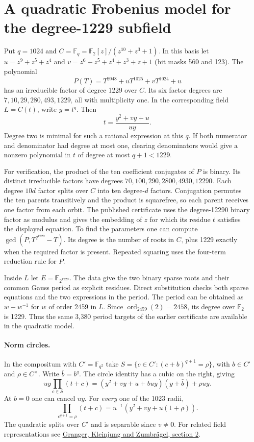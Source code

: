 \documentclass[11pt]{article}
\newcommand{\F}{\mathbb F_2}
\begin{document}
\section{A quadratic Frobenius model for the degree-1229 subfield}
\label{sec:quadratic-frobenius}
Put \(q=1024\) and \(C=\mathbb F_q=\F[z]/(z^{10}+z^3+1)\). In this
basis let \(u=z^9+z^5+z^4\) and \(v=z^6+z^5+z^4+z^3+z+1\)
(bit masks 560 and 123). The polynomial
\[
 P(T)=T^{2048}+uT^{1025}+vT^{1024}+u
\]
has an irreducible factor of degree 1229 over \(C\). Its six factor
degrees are \(7,10,29,280,493,1229\), all with multiplicity one.
In the corresponding field \(L=C(t)\), write \(y=t^q\). Then
\[
       t=\frac{y^2+vy+u}{uy}.
\]
Degree two is minimal for such a rational expression at this \(q\).
If both numerator and denominator had degree at most one, clearing
denominators would give a nonzero polynomial in \(t\) of degree at
most \(q+1<1229\).

For verification, the product of the ten coefficient conjugates
of \(P\) is binary. Its distinct irreducible factors have degrees
\(70,100,290,2800,4930,12290\). Each degree \(10d\) factor splits
over \(C\) into ten degree-\(d\) factors. Conjugation permutes the
ten parents transitively and the product is squarefree, so each
parent receives one factor from each orbit. The published certificate
uses the degree-12290 binary factor as modulus and gives the embedding
of \(z\) for which its residue \(t\) satisfies the displayed equation.
To find the parameters one can compute
\(\gcd(P,T^{q^{1229}}-T)\). Its degree is the number of roots in \(C\),
plus 1229 exactly when the required factor is present. Repeated
squaring uses the four-term reduction rule for \(P\).

Inside \(L\) let \(E=\mathbb F_{2^{1229}}\). The data give the two
binary sparse roots and their common Gauss period as explicit residues.
Direct substitution checks both sparse equations and the two
expressions in the period. The period can be obtained as
\(w+w^{-1}\) for \(w\) of order 2459 in \(L\). Since
\(\operatorname{ord}_{2459}(2)=2458\), its degree over \(\F\) is 1229.
Thus the same 3,380 period targets of the earlier certificate are
available in the quadratic model.

\paragraph{Norm circles.}
In the compositum with \(C'=\mathbb F_{q^2}\) take
\(S=\{c\in C':(c+b)^{q+1}=\rho\}\), with \(b\in C'\) and
\(\rho\in C^\times\). Write \(\bar b=b^q\). The circle identity has
a cubic on the right, giving
\[
 uy\prod_{c\in S}(t+c)
     =(y^2+vy+u+buy)(y+\bar b)+\rho uy .
\]
At \(b=0\) one can cancel \(uy\). For \emph{every} one of the 1023 radii,
\[
     \prod_{c^{q+1}=\rho}(t+c)=u^{-1}(y^2+vy+u(1+\rho)).
\]
The quadratic splits over \(C'\) and is separable since \(v\ne0\).
For related field representations see
\href{https://arxiv.org/abs/1402.3668}{Granger, Kleinjung and
Zumbr\"agel, section 2}.
\end{document}
